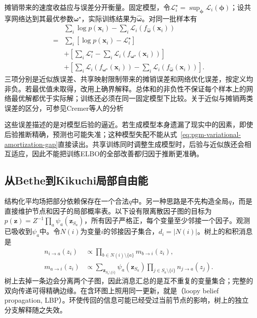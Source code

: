 摊销带来的速度收益应与误差分开衡量。固定模型，令$\mathcal L_i^\star=\sup_{\bm{\phi}}\mathcal L_i(\bm{\phi})$；设共享网络达到其最优参数$\bm{\omega}^\star$，实际训练结果为$\widehat{\bm{\omega}}$。对同一批样本有
\begin{equation}
  \begin{aligned}
    &\sum_i\log p(\bm x_i)
       -\sum_i\mathcal L_i(f_{\widehat{\bm{\omega}}}(\bm x_i))\\
    ={}&\sum_i[\log p(\bm x_i)-\mathcal L_i^\star]\\
     &+\left[\sum_i\mathcal L_i^\star
          -\sum_i\mathcal L_i(f_{\bm{\omega}^\star}(\bm x_i))\right]\\
     &+\left[\sum_i\mathcal L_i(f_{\bm{\omega}^\star}(\bm x_i))
          -\sum_i\mathcal L_i(f_{\widehat{\bm{\omega}}}(\bm x_i))\right].
  \end{aligned}
  \label{eq:pgm-variational-amortization-gap}
\end{equation}
三项分别是近似族误差、共享映射限制带来的摊销误差和网络优化误差，按定义均非负。若最优值未取得，改用上确界解释。总体和的非负性不保证每个样本上的网络最优解都优于实际解；训练还必须在同一固定模型下比较。关于近似与摊销两类误差的区分，可参见Cremer等人的分析

这些误差描述的是对模型后验的逼近。若生成模型本身遗漏了现实中的因素，即使后验推断精确，预测也可能失准；这种模型失配不能从式~\eqref{eq:pgm-variational-amortization-gap}直接读出。共享训练同时调整生成模型时，后验与近似族还会相互适应，因此不能把训练ELBO的全部改善都归因于推断更准确。

\subsection{从Bethe到Kikuchi局部自由能}
\label{sec:pgm-variational-bethe-kikuchi}
\label{sec:pgm-variational-local-free-energy}
\label{sec:pgm-variational-bethe}

结构化平均场把部分依赖保存在一个合法$q$中。另一种思路是不先构造全局$q$，而是直接维护节点和因子的局部概率表。以下设有限离散因子图的目标为$p(\bm z)=Z^{-1}\prod_a\psi_a(\bm z_{S_a})$，所有因子严格正，每个变量至少邻接一个因子。观测已吸收到$\psi_a$中。令$N(i)$为变量$i$的邻接因子集合，$d_i=|N(i)|$。树上的和积消息是
\begin{equation}
  \begin{aligned}
    n_{i\to a}(z_i)
      &\propto\prod_{b\in N(i)\setminus\{a\}}m_{b\to i}(z_i),\\
    m_{a\to i}(z_i)
      &\propto\sum_{\bm z_{S_a\setminus\{i\}}}
            \psi_a(\bm z_{S_a})
            \prod_{j\in S_a\setminus\{i\}}n_{j\to a}(z_j).
  \end{aligned}
  \label{eq:pgm-variational-lbp}
\end{equation}
树上去掉一条边会分离两个子图，因此消息汇总的是互不重复的变量集合；完整的双向传递可得精确边缘。在含环图上照用同一更新，就是（loopy belief propagation, LBP）。环使传回的信息可能已经受过当前节点的影响，树上的独立分支解释随之失效。

